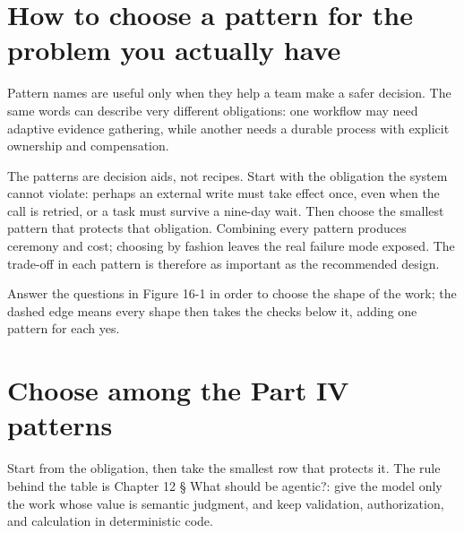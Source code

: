 
\section{How to choose a pattern for the problem you actually have}

Pattern names are useful only when they help a team make a safer decision. The same words can describe very different obligations: one workflow may need adaptive evidence gathering, while another needs a durable process with explicit ownership and compensation.\par

The patterns are decision aids, not recipes. Start with the obligation the system cannot violate: perhaps an external write must take effect once, even when the call is retried, or a task must survive a nine-day wait. Then choose the smallest pattern that protects that obligation. Combining every pattern produces ceremony and cost; choosing by fashion leaves the real failure mode exposed. The trade-off in each pattern is therefore as important as the recommended design.\par

Answer the questions in Figure 16-1 in order to choose the shape of the work; the dashed edge means every shape then takes the checks below it, adding one pattern for each yes.\par


\section{Choose among the Part IV patterns}

Start from the obligation, then take the smallest row that protects it. The rule behind the table is Chapter 12 § What should be agentic?: give the model only the work whose value is semantic judgment, and keep validation, authorization, and calculation in deterministic code.\par

